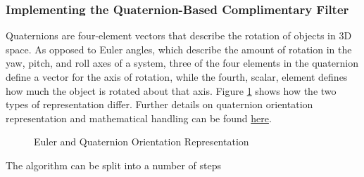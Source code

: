 \documentclass[11pt]{article} %
\begin{document}
\subsubsection{Implementing the Quaternion-Based Complimentary Filter}
Quaternions are four-element vectors that describe the rotation of objects in 3D space. As opposed to Euler angles, which describe the amount of rotation in the yaw, pitch, and roll axes of a system, three of the four elements in the quaternion define a vector for the axis of rotation, while the fourth, scalar, element defines how much the object is rotated about that axis. Figure \ref{fig:euler_quat} shows how the two types of representation differ. Further details on quaternion orientation representation and mathematical handling can be found \href{http://www.chrobotics.com/library/understanding-quaternions}{here}.
\begin{figure}[H]
\centering
{}\qquad
{}
\caption{Euler and Quaternion Orientation Representation}
\label{fig:euler_quat}
\end{figure}

The algorithm can be split into a number of steps
\end{document}
